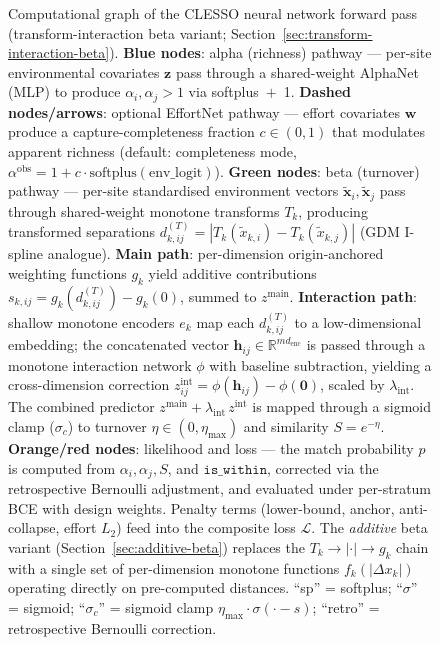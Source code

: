 \documentclass{article}
\begin{document}
\begin{figure}[p]
{\begin{tikzpicture}
\end{tikzpicture}
}%
\caption{%
Computational graph of the CLESSO neural network forward pass (transform-interaction beta variant; Section~\ref{sec:transform-interaction-beta}).
\textbf{Blue nodes}: alpha (richness) pathway --- per-site environmental covariates $\mathbf{z}$ pass through a shared-weight AlphaNet (MLP) to produce $\alpha_i, \alpha_j > 1$ via softplus~$+$~1.
\textbf{Dashed nodes/arrows}: optional EffortNet pathway --- effort covariates $\mathbf{w}$ produce a capture-completeness fraction $c \in (0,1)$ that modulates apparent richness (default: completeness mode, $\alpha^{\mathrm{obs}} = 1 + c\cdot\mathrm{softplus}(\mathrm{env\_logit})$).
\textbf{Green nodes}: beta (turnover) pathway --- per-site standardised environment vectors $\tilde{\mathbf{x}}_i, \tilde{\mathbf{x}}_j$ pass through shared-weight monotone transforms $T_k$, producing transformed separations $d^{(T)}_{k,ij} = |T_k(\tilde{x}_{k,i}) - T_k(\tilde{x}_{k,j})|$ (GDM I-spline analogue). \textbf{Main path}: per-dimension origin-anchored weighting functions $g_k$ yield additive contributions $s_{k,ij} = g_k(d^{(T)}_{k,ij}) - g_k(0)$, summed to $z^{\mathrm{main}}$. \textbf{Interaction path}: shallow monotone encoders $e_k$ map each $d^{(T)}_{k,ij}$ to a low-dimensional embedding; the concatenated vector $\mathbf{h}_{ij} \in \mathbb{R}^{m d_{\mathrm{enc}}}$ is passed through a monotone interaction network $\phi$ with baseline subtraction, yielding a cross-dimension correction $z^{\mathrm{int}}_{ij} = \phi(\mathbf{h}_{ij}) - \phi(\mathbf{0})$, scaled by $\lambda_{\mathrm{int}}$. The combined predictor $z^{\mathrm{main}} + \lambda_{\mathrm{int}}\,z^{\mathrm{int}}$ is mapped through a sigmoid clamp ($\sigma_c$) to turnover $\eta \in (0, \eta_{\max})$ and similarity $S = e^{-\eta}$.
\textbf{Orange/red nodes}: likelihood and loss --- the match probability $p$ is computed from $\alpha_i, \alpha_j, S$, and $\texttt{is\_within}$, corrected via the retrospective Bernoulli adjustment, and evaluated under per-stratum BCE with design weights.  Penalty terms (lower-bound, anchor, anti-collapse, effort $L_2$) feed into the composite loss $\mathcal{L}$.
The \emph{additive} beta variant (Section~\ref{sec:additive-beta}) replaces the $T_k \to |\cdot| \to g_k$ chain with a single set of per-dimension monotone functions $f_k(|\Delta x_k|)$ operating directly on pre-computed distances.
``sp'' = softplus; ``$\sigma$'' = sigmoid; ``$\sigma_c$'' = sigmoid clamp $\eta_{\max}\cdot\sigma(\cdot - s)$; ``retro'' = retrospective Bernoulli correction.%
}
\label{fig:comp-graph}
\end{figure}
\end{document}
